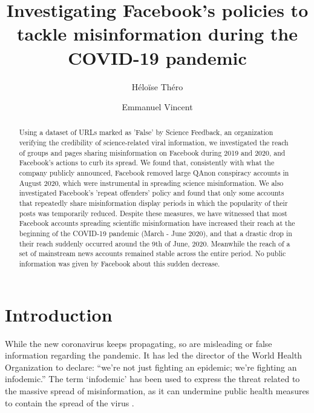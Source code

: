 \documentclass[sigconf]{acmart}
\begin{document}
\title{Investigating Facebook's policies to tackle misinformation during the COVID-19 pandemic}

\author{H\'elo\"{i}se Th\'ero}

\author{Emmanuel Vincent}

\renewcommand{\shortauthors}{Th\'ero et Vincent}


\begin{abstract}
Using a dataset of URLs marked as 'False' by Science Feedback, an organization verifying the credibility of science-related viral information, we investigated the reach of groups and pages sharing misinformation on Facebook during 2019 and 2020, and Facebook's actions to curb its spread. We found that, consistently with what the company publicly announced, Facebook removed large QAnon conspiracy accounts in August 2020, which were instrumental in spreading science misinformation. We also investigated Facebook's 'repeat offenders' policy and found that only some accounts that repeatedly share misinformation display periods in which the popularity of their posts was temporarily reduced. Despite these measures, we have witnessed that most Facebook accounts spreading scientific misinformation have increased their reach at the beginning of the COVID-19 pandemic (March - June 2020), and that a drastic drop in their reach suddenly occurred around the 9th of June, 2020. Meanwhile the reach of a set of mainstream news accounts remained stable across the entire period. No public information was given by Facebook about this sudden decrease.
\end{abstract}



\maketitle

\section{Introduction}

While the new coronavirus keeps propagating, so are misleading or false information regarding the pandemic. It has led the director of the World Health Organization to declare: ``we're not just fighting an epidemic; we're fighting an infodemic.'' \cite{WHOinfodemic} The term `infodemic' has been used to express the threat related to the massive spread of misinformation, as it can undermine public health measures to contain the spread of the virus \cite{zarocostas2020fight}.
\end{document}
